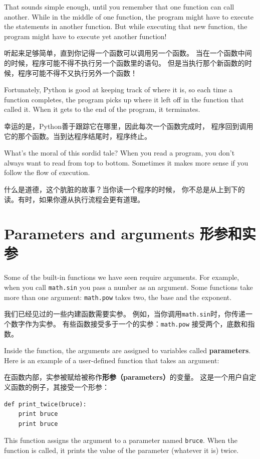\documentclass[10pt]{book}
\begin{document}
\begin{CJK}{UTF8}{gbsn}
That sounds simple enough, until you remember that one function can
call another.  While in the middle of one function, the program might
have to execute the statements in another function. But while
executing that new function, the program might have to execute yet
another function!

听起来足够简单，直到你记得一个函数可以调用另一个函数。
当在一个函数中间的时候，程序可能不得不执行另一个函数里的语句。
但是当执行那个新函数的时候，程序可能不得不又执行另外一个函数！

Fortunately, Python is good at keeping track of where it is, so each
time a function completes, the program picks up where it left off in
the function that called it.  When it gets to the end of the program,
it terminates.

幸运的是，Python善于跟踪它在哪里，因此每次一个函数完成时，
程序回到调用它的那个函数。当到达程序结尾时，程序终止。

What's the moral of this sordid tale?  When you read a program, you
don't always want to read from top to bottom.  Sometimes it makes
more sense if you follow the flow of execution.

什么是道德，这个肮脏的故事？当你读一个程序的时候，
你不总是从上到下的读。有时，如果你遵从执行流程会更有道理。

\section{Parameters and arguments 形参和实参}
\label{parameters}

Some of the built-in functions we have seen require arguments.  For
example, when you call {\tt math.sin} you pass a number
as an argument.  Some functions take more than one argument:
{\tt math.pow} takes two, the base and the exponent.

我们已经见过的一些内建函数需要实参。
例如，当你调用{\tt math.sin}时，你传递一个数字作为实参。
有些函数接受多于一个的实参：{\tt math.pow} 接受两个，底数和指数。

Inside the function, the arguments are assigned to
variables called {\bf parameters}.  Here is an example of a
user-defined function that takes an argument:

在函数内部，实参被赋给被称作{\bf 形参（parameters）}的变量。
这是一个用户自定义函数的例子，其接受一个形参：

\begin{verbatim}
def print_twice(bruce):
    print bruce
    print bruce
\end{verbatim}
%
This function assigns the argument to a parameter
named {\tt bruce}.  When the function is called, it prints the value of
the parameter (whatever it is) twice.


\end{CJK}
\end{document}
